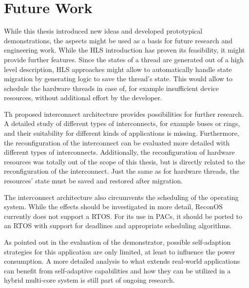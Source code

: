 \section{Future Work}
While this thesis introduced new ideas and developed prototypical
demonstrations, the aspects might be used as a basis for future research and
engineering work. While the \ac{HLS} introduction has proven its feasibility,
it might provide further features. Since the states of a thread are generated
out of a high level description, \ac{HLS} approaches might allow to
automatically handle state migration by generating logic to save the thread's
state. This would allow to schedule the hardware threads in case of, for
example insufficient device resources, without additional effort by the
developer.

Th proposed interconnect architecture provides possibilities for further
research. A detailed study of different types of interconnects, for example
buses or rings, and their suitability for different kinds of applications is
missing. Furthermore, the reconfiguration of the interconnect can be
evaluated more detailed with different types of interconnects. Additionally,
the reconfiguration of hardware resources was totally out of the scope of this
thesis, but is directly related to the reconfiguration of the interconnect.
Just the same as for hardware threads, the resources' state must be saved and
restored after migration.

The interconnect architecture also circumvents the scheduling of the operating
system. While the effects should be investigated in more detail, ReconOS
currently does not support a \ac{RTOS}. For its use in \acp{PAC}, it should be
ported to an \ac{RTOS} with support for deadlines and appropriate scheduling
algorithms.

As pointed out in the evaluation of the demonstrator, possible self-adaption
strategies for this application are only limited, at least to influence the
power consumption. A more detailed analysis to what extends real-world
applications can benefit from self-adaptive capabilities and how they can be
utilized in a hybrid multi-core system is still part of ongoing research.